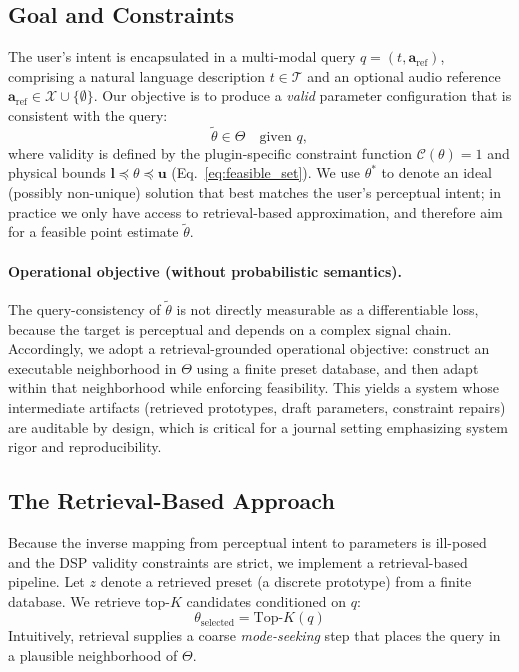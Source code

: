 \subsection{Goal and Constraints}
The user's intent is encapsulated in a multi-modal query $q = (t, \mathbf{a}_{\text{ref}})$, comprising a natural language description $t \in \mathcal{T}$ and an optional audio reference $\mathbf{a}_{\text{ref}} \in \mathcal{X} \cup \{\emptyset\}$. Our objective is to produce a \emph{valid} parameter configuration that is consistent with the query:
\begin{equation}
	\tilde{\theta} \in \Theta \quad \text{given } q,
\end{equation}
where validity is defined by the plugin-specific constraint function $\mathcal{C}(\theta)=1$ and physical bounds $\mathbf{l} \preceq \theta \preceq \mathbf{u}$ (Eq.~\ref{eq:feasible_set}). We use $\theta^*$ to denote an ideal (possibly non-unique) solution that best matches the user's perceptual intent; in practice we only have access to retrieval-based approximation, and therefore aim for a feasible point estimate $\tilde{\theta}$.

\paragraph{Operational objective (without probabilistic semantics).}
The query-consistency of $\tilde{\theta}$ is not directly measurable as a differentiable loss, because the target is perceptual and depends on a complex signal chain. Accordingly, we adopt a retrieval-grounded operational objective: construct an executable neighborhood in $\Theta$ using a finite preset database, and then adapt within that neighborhood while enforcing feasibility. This yields a system whose intermediate artifacts (retrieved prototypes, draft parameters, constraint repairs) are auditable by design, which is critical for a journal setting emphasizing system rigor and reproducibility.

\subsection{The Retrieval-Based Approach}
Because the inverse mapping from perceptual intent to parameters is ill-posed and the DSP validity constraints are strict, we implement a retrieval-based pipeline. Let $z$ denote a retrieved preset (a discrete prototype) from a finite database. We retrieve top-$K$ candidates conditioned on $q$:
\begin{equation}
	\theta_{\text{selected}} = \text{Top-}K(q)
\end{equation}
Intuitively, retrieval supplies a coarse \textit{mode-seeking} step that places the query in a plausible neighborhood of $\Theta$.

